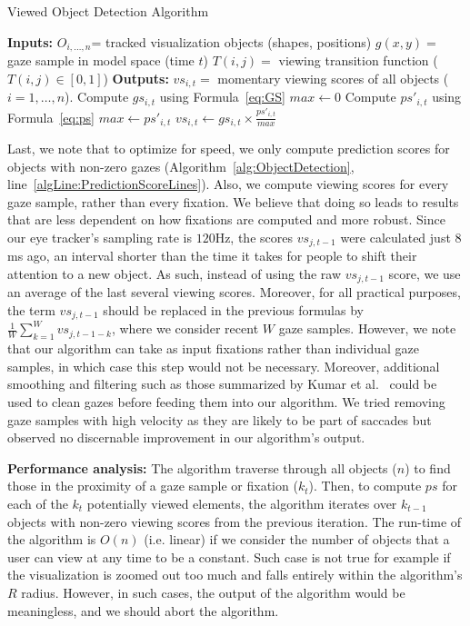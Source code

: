 \begin{algorithm}
\caption{Viewed Object Detection Algorithm}
\label{alg:ObjectDetection}
\begin{algorithmic}[1]
\State \textbf{Inputs: } 
\Statex $O_{i, \ldots, n}$= tracked visualization objects (shapes, positions)
\Statex $g(x,y) = $ gaze sample in model space (time $t$)
\Statex $T(i,j) = $ viewing transition function ($T(i,j) \in [0,1]$)
\State \textbf{Outputs:}
\Statex $vs_{i,t} = $ momentary viewing scores of all objects ($i = 1, \ldots, n$). 
	\State Compute $gs_{i,t}$	using Formula~\ref{eq:GS}
\EndFor
\State $max \gets 0$
	 \label{algLine:PredictionScoreLines}
		\State Compute $ps'_{i,t}$	using Formula~\ref{eq:ps}
			\State $max \gets ps'_{i,t}$
		\EndIf
	\EndIf
\EndFor
{}
	\State $vs_{i,t} \gets gs_{i,t} \times \frac{ps'_{i,t}}{max} $
\EndFor
\end{algorithmic}
\end{algorithm}

Last, we note that to optimize for speed, we only compute prediction scores for objects with non-zero gazes (Algorithm~\ref{alg:ObjectDetection}, line~\ref{algLine:PredictionScoreLines}). Also, we compute viewing scores for every gaze sample, rather than every fixation. We believe that doing so leads to results that are less dependent on how fixations are computed and more robust. Since our eye tracker's sampling rate is $120$Hz, the scores $vs_{j, t-1}$ were calculated just $8$ms ago, an interval shorter than the time it takes for people to shift their attention to a new object. As such, instead of using the raw $vs_{j,t-1}$ score, we use an average of the last several viewing scores. Moreover, for all practical purposes, the term $vs_{j,t-1}$ should be replaced in the previous formulas by $ \frac{1}{W}\displaystyle \sum_{k=1}^{W}{vs_{j,t-1-k}}$, where we consider recent $W$ gaze samples. However, we note that our algorithm can take as input fixations rather than individual gaze samples, in which case this step would not be necessary. Moreover, additional smoothing and filtering such as those summarized by Kumar et al.~\cite{Kum08} could be used to clean gazes before feeding them into our algorithm. We tried removing gaze samples with high velocity as they are likely to be part of saccades but observed no discernable improvement in our algorithm's output. 


{\bf Performance analysis:} The algorithm traverse through all objects ($n$) to find those in the proximity of a gaze sample or fixation ($k_t$). Then, to compute $ps$ for each of the $k_t$ potentially viewed elements, the algorithm iterates over $k_{t-1}$ objects with non-zero viewing scores from the previous iteration. The run-time of the algorithm is $O(n)$ (i.e. linear) if we consider the number of objects that a user can view at any time to be a constant. Such case is not true for example if the visualization is zoomed out too much and falls entirely within the algorithm's $R$ radius. However, in such cases, the output of the algorithm would be meaningless, and we should abort the algorithm.